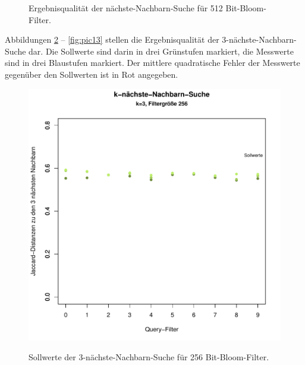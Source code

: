 \begin{figure}[hpbt]
  	\caption[Ergebnisqualität der nächste-Nachbarn-Suche für 512 Bit-Bloom-Filter]{Ergebnisqualität der nächste-Nachbarn-Suche für 512 Bit-Bloom-Filter.}\label{fig:pic9}
\end{figure}

Abbildungen \ref{fig:pic10} -- \ref{fig:pic13} stellen die Ergebnisqualität der 3-nächste-Nachbarn-Suche dar. Die Sollwerte sind darin in drei Grünstufen markiert, die Messwerte sind in drei Blaustufen markiert. Der mittlere quadratische Fehler der Messwerte gegenüber den Sollwerten ist in Rot angegeben.
\begin{figure}
	\centering
	\includegraphics[scale=0.7]{pictures/nn3_256-1.pdf}\\
	\caption[Sollwerte der 3-nächste-Nachbarn-Suche für 256 Bit-Bloom-Filter]{Sollwerte der 3-nächste-Nachbarn-Suche für 256 Bit-Bloom-Filter.}\label{fig:pic10}

\end{figure}
